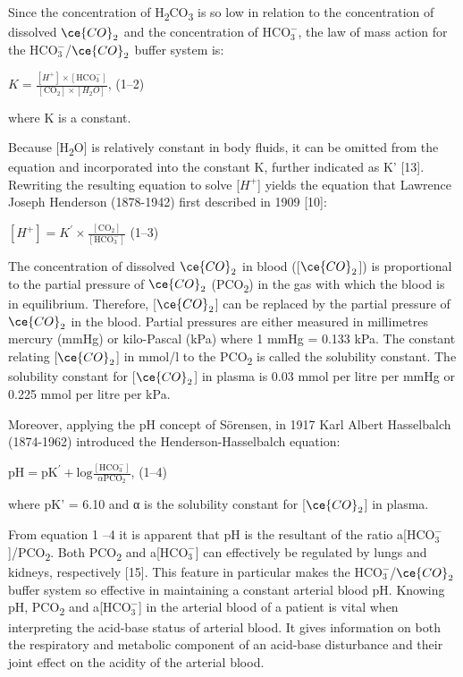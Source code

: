 \documentclass[
  12pt,
  a4paperpaper,
]{report}
\begin{document}
Since the concentration of H\textsubscript{2}CO\textsubscript{3} is so
low in relation to the concentration of dissolved \(\ce{CO}_{2}\) and
the concentration of \(\text{HCO}_{3}^{-}\), the law of mass action for
the \(\text{HCO}_{3}^{-}\)/\(\ce{CO}_{2}\) buffer system is:

\(K = \frac{\left\lbrack H^{+} \right\rbrack \times \left\lbrack \text{HCO}_{3}^{-} \right\rbrack}{\left\lbrack \text{CO}_{2} \right\rbrack \times \left\lbrack H_{2}O \right\rbrack}\),
(1--2)

where K is a constant.

Because {[}H\textsubscript{2}O{]} is relatively constant in body fluids,
it can be omitted from the equation and incorporated into the constant
K, further indicated as K' {[}13{]}. Rewriting the resulting equation to
solve {[}\(H^{+}\){]} yields the equation that Lawrence Joseph Henderson
(1878-1942) first described in 1909 {[}10{]}:

\(\left\lbrack H^{+} \right\rbrack = K^{'} \times \frac{\left\lbrack \text{CO}_{2} \right\rbrack}{\left\lbrack \text{HCO}_{3}^{-} \right\rbrack}\)
(1--3)

The concentration of dissolved \(\ce{CO}_{2}\) in blood
({[}\(\ce{CO}_{2}\){]}) is proportional to the partial pressure of
\(\ce{CO}_{2}\) (PCO\textsubscript{2}) in the gas with which the blood
is in equilibrium. Therefore, {[}\(\ce{CO}_{2}\){]} can be replaced by
the partial pressure of \(\ce{CO}_{2}\) in the blood. Partial pressures
are either measured in millimetres mercury (mmHg) or kilo-Pascal (kPa)
where 1 mmHg = 0.133 kPa. The constant relating {[}\(\ce{CO}_{2}\){]} in
mmol/l to the PCO\textsubscript{2} is called the solubility constant.
The solubility constant for {[}\(\ce{CO}_{2}\){]} in plasma is 0.03 mmol
per litre per mmHg or 0.225 mmol per litre per kPa.

Moreover, applying the pH concept of Sörensen, in 1917 Karl Albert
Hasselbalch (1874-1962) introduced the Henderson-Hasselbalch equation:

\(\text{pH} = \text{pK}^{'} + \text{log}\frac{\left\lbrack \text{HCO}_{3}^{-} \right\rbrack}{\alpha\text{PCO}_{2}}\),
(1--4)

where pK' = 6.10 and α is the solubility constant for
{[}\(\ce{CO}_{2}\){]} in plasma.

From equation 1 --4 it is apparent that pH is the resultant of the ratio
a{[}\(\text{HCO}_{3}^{-}\){]}/P\textsc{CO}\textsubscript{2}. Both
P\textsc{CO}\textsubscript{2} and a{[}\(\text{HCO}_{3}^{-}\){]} can
effectively be regulated by lungs and kidneys, respectively {[}15{]}.
This feature in particular makes the
\(\text{HCO}_{3}^{-}\)/\(\ce{CO}_{2}\) buffer system so effective in
maintaining a constant arterial blood pH. Knowing pH,
PCO­­\textsubscript{2} and a{[}\(\text{HCO}_{3}^{-}\){]} in the arterial
blood of a patient is vital when interpreting the acid-base status of
arterial blood. It gives information on both the respiratory and
metabolic component of an acid-base disturbance and their joint effect
on the acidity of the arterial blood.
\end{document}
